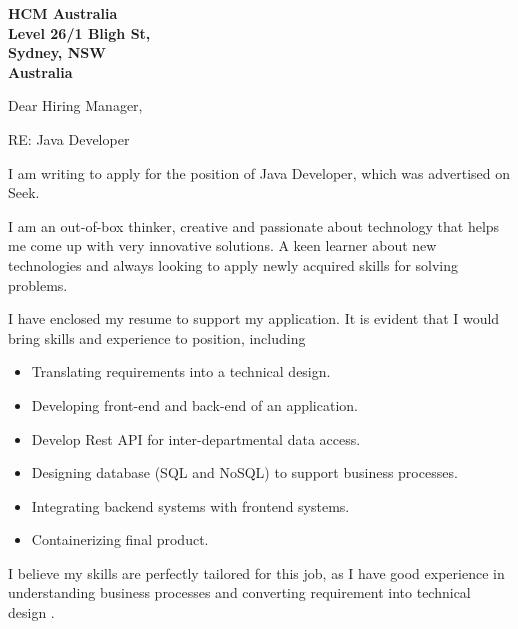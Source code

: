 \documentclass{letter}
\begin{document}
\begin{letter}{\bf HCM Australia \\Level 26/1 Bligh St, \\Sydney, NSW \\ Australia}

\opening{Dear Hiring Manager,\\}

RE: Java Developer


I am writing to apply for the position of Java Developer, which was advertised on Seek.


I am an out-of-box thinker, creative and passionate about technology that helps me come up with very innovative solutions. A keen learner about new technologies and always looking to apply newly acquired skills for solving problems.

I have enclosed my resume to support my application. It is evident that I would bring skills and experience to position, including\\
\begin{itemize}
\item Translating requirements into a technical design.
\item Developing front-end and back-end of an application.
\item Develop Rest API for inter-departmental data access.
\item Designing database (SQL and NoSQL) to support business processes.
\item Integrating backend systems with frontend systems.
\item Containerizing final product.
\end{itemize}

I believe my skills are perfectly tailored for this job, as I have good experience in understanding business processes and converting requirement into technical design .


\end{letter}
\end{document}
